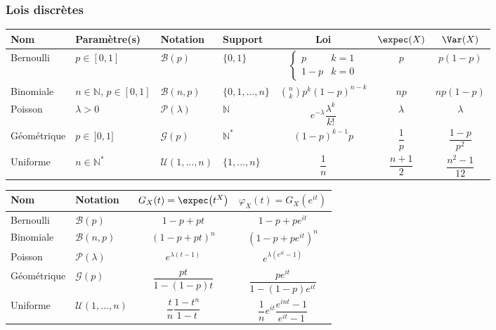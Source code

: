 \subsubsection{Lois discrètes}

\begin{center}
\footnotesize
\setlength{\tabcolsep}{4pt}
\begin{tabular}{llllccc}
  \toprule
  Nom & Paramètre(s) & Notation & Support & Loi & $\expec(X)$ & $\Var(X)$ \\
  \midrule
  Bernoulli & $p \in [0,1]$ & $\mathcal{B}(p)$ & $\{0,1\}$
    & $\begin{cases} p & k = 1\\ 1-p & k = 0\end{cases}$ & $p$ & $p(1-p)$ \\[6pt]
  Binomiale & $n \in \mathbb{N}$, $p \in [0,1]$ & $\mathcal{B}(n,p)$
    & $\{0,1,\dots,n\}$ & $\binom{n}{k}p^{k}(1-p)^{n-k}$ & $np$ & $np(1-p)$ \\[3pt]
  Poisson & $\lambda > 0$ & $\mathcal{P}(\lambda)$ & $\mathbb{N}$
    & $e^{-\lambda}\dfrac{\lambda^{k}}{k!}$ & $\lambda$ & $\lambda$ \\[5pt]
  Géométrique & $p \in\, ]0,1]$ & $\mathcal{G}(p)$ & $\mathbb{N}^{*}$
    & $(1-p)^{k-1}p$ & $\dfrac{1}{p}$ & $\dfrac{1-p}{p^{2}}$ \\[5pt]
  Uniforme & $n \in \mathbb{N}^{*}$ & $\mathcal{U}(1,\dots,n)$ & $\{1,\dots,n\}$
    & $\dfrac{1}{n}$ & $\dfrac{n+1}{2}$ & $\dfrac{n^{2}-1}{12}$ \\
  \bottomrule
\end{tabular}
\end{center}

\begin{center}
\footnotesize
\setlength{\tabcolsep}{6pt}
\begin{tabular}{llcc}
  \toprule
  Nom & Notation & $G_{X}(t) = \expec\!\left(t^{X}\right)$
    & $\varphi_{X}(t) = G_{X}\!\left(e^{it}\right)$ \\
  \midrule
  Bernoulli & $\mathcal{B}(p)$ & $1-p+pt$ & $1-p+pe^{it}$ \\[3pt]
  Binomiale & $\mathcal{B}(n,p)$ & $(1-p+pt)^{n}$ & $\left(1-p+pe^{it}\right)^{n}$
    \\[3pt]
  Poisson & $\mathcal{P}(\lambda)$ & $e^{\lambda(t-1)}$
    & $e^{\lambda\left(e^{it}-1\right)}$ \\[3pt]
  Géométrique & $\mathcal{G}(p)$ & $\dfrac{pt}{1-(1-p)t}$
    & $\dfrac{pe^{it}}{1-(1-p)e^{it}}$ \\[5pt]
  Uniforme & $\mathcal{U}(1,\dots,n)$ & $\dfrac{t}{n}\dfrac{1-t^{n}}{1-t}$
    & $\dfrac{1}{n}e^{it}\dfrac{e^{int}-1}{e^{it}-1}$ \\
  \bottomrule
\end{tabular}
\end{center}


